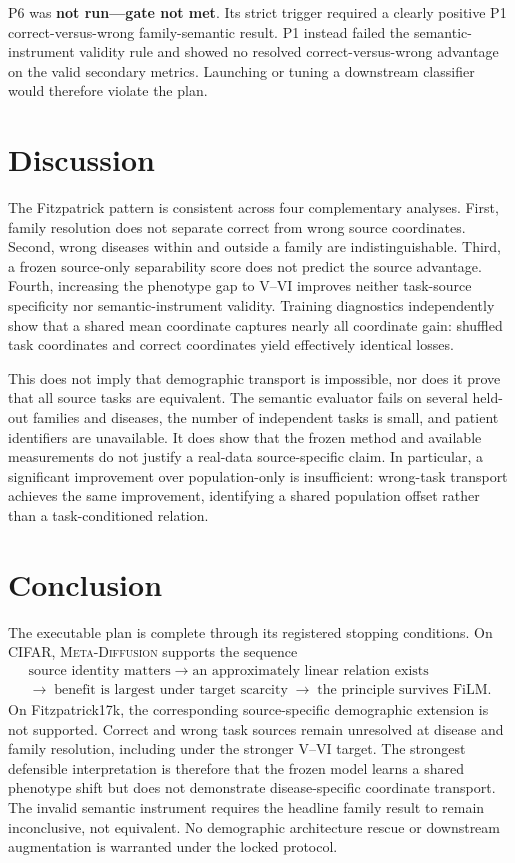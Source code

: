 \documentclass{article}
\newcommand{\method}{\textsc{Meta-Diffusion}}
\begin{document}
P6 was \textbf{not run---gate not met}.  Its strict trigger required a clearly positive P1
correct-versus-wrong family-semantic result.  P1 instead failed the semantic-instrument
validity rule and showed no resolved correct-versus-wrong advantage on the valid secondary
metrics.  Launching or tuning a downstream classifier would therefore violate the plan.

\section{Discussion}

The Fitzpatrick pattern is consistent across four complementary analyses.  First, family
resolution does not separate correct from wrong source coordinates.  Second, wrong diseases
within and outside a family are indistinguishable.  Third, a frozen source-only separability
score does not predict the source advantage.  Fourth, increasing the phenotype gap to V--VI
improves neither task-source specificity nor semantic-instrument validity.  Training
diagnostics independently show that a shared mean coordinate captures nearly all coordinate
gain: shuffled task coordinates and correct coordinates yield effectively identical losses.

This does not imply that demographic transport is impossible, nor does it prove that all
source tasks are equivalent.  The semantic evaluator fails on several held-out families and
diseases, the number of independent tasks is small, and patient identifiers are unavailable.
It does show that the frozen method and available measurements do not justify a real-data
source-specific claim.  In particular, a significant improvement over population-only is
insufficient: wrong-task transport achieves the same improvement, identifying a shared
population offset rather than a task-conditioned relation.

\section{Conclusion}

The executable plan is complete through its registered stopping conditions.  On CIFAR,
\method{} supports the sequence
\[
\boxed{\begin{gathered}
\text{source identity matters}
\;\rightarrow\;
\text{an approximately linear relation exists}
\\[-1pt]
\rightarrow\;
\text{benefit is largest under target scarcity}
\;\rightarrow\;
\text{the principle survives FiLM}.
\end{gathered}}
\]
On Fitzpatrick17k, the corresponding source-specific demographic extension is not supported.
Correct and wrong task sources remain unresolved at disease and family resolution, including
under the stronger V--VI target.  The strongest defensible interpretation is therefore that
the frozen model learns a shared phenotype shift but does not demonstrate disease-specific
coordinate transport.  The invalid semantic instrument requires the headline family result
to remain inconclusive, not equivalent.  No demographic architecture rescue or downstream
augmentation is warranted under the locked protocol.
\end{document}
